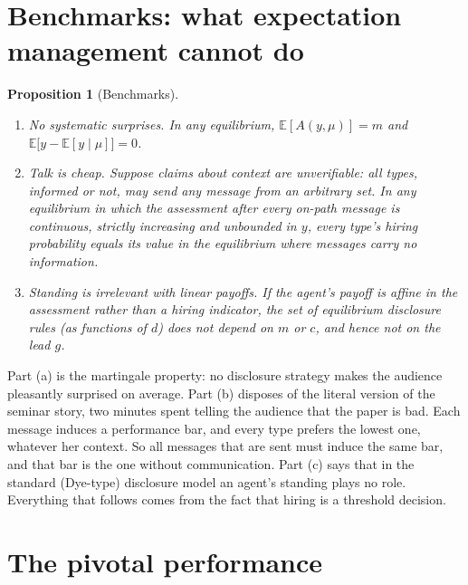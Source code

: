 \documentclass[11pt]{article}
\newtheorem{proposition}{Proposition}
\theoremstyle{definition}
\newcommand{\E}{\mathbb{E}}
\begin{document}
\section{Benchmarks: what expectation management cannot do}\label{sec:benchmarks}

\begin{proposition}[Benchmarks]\label{prop:benchmarks}
\leavevmode
\begin{enumerate}[label=(\alph*)]
\item \emph{No systematic surprises.} In any equilibrium, $\E[A(y,\mu)]=m$ and $\E\big[y-\E[y\mid\mu]\big]=0$.
\item \emph{Talk is cheap.} Suppose claims about context are unverifiable: all types, informed or not, may send any message from an arbitrary set. In any equilibrium in which the assessment after every on-path message is continuous, strictly increasing and unbounded in $y$, every type's hiring probability equals its value in the equilibrium where messages carry no information.
\item \emph{Standing is irrelevant with linear payoffs.} If the agent's payoff is affine in the assessment rather than a hiring indicator, the set of equilibrium disclosure rules (as functions of $d$) does not depend on $m$ or $c$, and hence not on the lead $g$.
\end{enumerate}
\end{proposition}

Part (a) is the martingale property: no disclosure strategy makes the audience pleasantly surprised on average. Part (b) disposes of the literal version of the seminar story, two minutes spent telling the audience that the paper is bad. Each message induces a performance bar, and every type prefers the lowest one, whatever her context. So all messages that are sent must induce the same bar, and that bar is the one without communication. Part (c) says that in the standard (Dye-type) disclosure model an agent's standing plays no role. Everything that follows comes from the fact that hiring is a threshold decision.

\section{The pivotal performance}\label{sec:pivotal}
\end{document}
